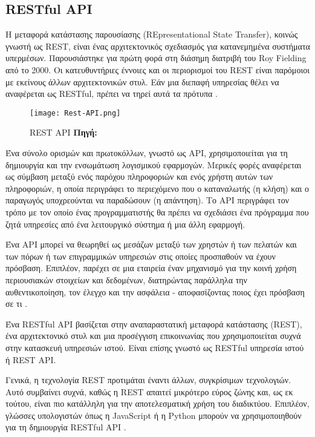\subsection{RESTful API}
Η μεταφορά κατάστασης παρουσίασης (REpresentational State Transfer), κοινώς γνωστή ως REST, είναι ένας αρχιτεκτονικός σχεδιασμός για κατανεμημένα συστήματα υπερμέσων. Παρουσιάστηκε για πρώτη φορά στη διάσημη διατριβή του Roy Fielding από το 2000.
Οι κατευθυντήριες έννοιες και οι περιορισμοί του REST είναι παρόμοιοι με εκείνους άλλων αρχιτεκτονικών στυλ. Εάν μια διεπαφή υπηρεσίας θέλει να αναφέρεται ως RESTful, πρέπει να τηρεί αυτά τα πρότυπα \cite{Gupta_2020}.

\begin{figure}[h]
	\centering
	\texttt{[image: Rest-API.png]}
	\caption[{REST API}]{REST API \textbf{Πηγή:} \parencite{fig_Rest_API}}
	\label{fig:rest_api}
\end{figure}

Ένα σύνολο ορισμών και πρωτοκόλλων, γνωστό ως API, χρησιμοποιείται για τη δημιουργία και την ενσωμάτωση λογισμικού εφαρμογών. Μερικές φορές αναφέρεται ως σύμβαση μεταξύ ενός παρόχου πληροφοριών και ενός χρήστη αυτών των πληροφοριών, η οποία περιγράφει το περιεχόμενο που ο καταναλωτής (η κλήση) και ο παραγωγός υποχρεούνται να παραδώσουν (η απάντηση). Το API περιγράφει τον τρόπο με τον οποίο ένας προγραμματιστής θα πρέπει να σχεδιάσει ένα πρόγραμμα που ζητά υπηρεσίες από ένα λειτουργικό σύστημα ή μια άλλη εφαρμογή. 

Ένα API μπορεί να θεωρηθεί ως μεσάζων μεταξύ των χρηστών ή των πελατών και των πόρων ή των επιγραμμικών υπηρεσιών στις οποίες προσπαθούν να έχουν πρόσβαση. Επιπλέον, παρέχει σε μια εταιρεία έναν μηχανισμό για την κοινή χρήση περιουσιακών στοιχείων και δεδομένων, διατηρώντας παράλληλα την αυθεντικοποίηση, τον έλεγχο και την ασφάλεια - αποφασίζοντας ποιος έχει πρόσβαση σε τι \cite{RedHat_2020}. 

Ένα RESTful API βασίζεται στην αναπαραστατική μεταφορά κατάστασης (REST), ένα αρχιτεκτονικό στυλ και μια προσέγγιση επικοινωνίας που χρησιμοποιείται συχνά στην κατασκευή υπηρεσιών ιστού. Είναι επίσης γνωστό ως RESTful υπηρεσία ιστού ή REST API.

Γενικά, η τεχνολογία REST προτιμάται έναντι άλλων, συγκρίσιμων τεχνολογιών. Αυτό συμβαίνει συχνά, καθώς η REST απαιτεί μικρότερο εύρος ζώνης και, ως εκ τούτου, είναι πιο κατάλληλη για την αποτελεσματική χρήση του διαδικτύου. Επιπλέον, γλώσσες υπολογιστών όπως η JavaScript ή η Python μπορούν να χρησιμοποιηθούν για τη δημιουργία RESTful API \cite{Gillis_2020}.

